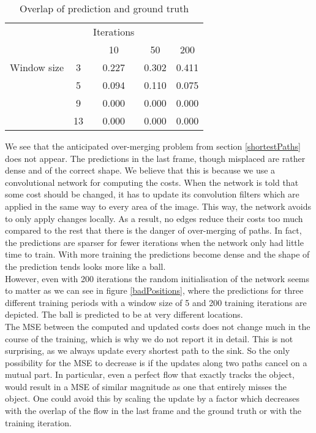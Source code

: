 \documentclass{article}
\begin{document}
{\begin{table}
  \caption{Overlap of prediction and ground truth}
  \label{overlap}
  \centering
  \begin{tabular}{lcccc}
    \hline
    \abovespace
			    & &Iterations &&\\
                &    & 10    & 50    & 200 \\
    \hline
    \abovespace
    Window size & 3  & 0.227 & 0.302 & 0.411 \\
                & 5  & 0.094 & 0.110 & 0.075 \\
                & 9  & 0.000 & 0.000 & 0.000 \\
                & 13 & 0.000 & 0.000 & 0.000 \\
    \hline
  \end{tabular}
\end{table}
We see that the anticipated over-merging problem from section \ref{shortestPaths} does not appear. The predictions in the last frame, though misplaced are rather dense and of the correct shape. We believe that this is because we use a convolutional network for computing the costs. When the network is told that some cost should be changed, it has to update its convolution filters which are applied in the same way to every area of the image. This way, the network avoids to only apply changes locally. As a result, no edges reduce their costs too much compared to the rest that there is the danger of over-merging of paths. In fact, the predictions are sparser for fewer iterations when the network only had little time to train. With more training the predictions become dense and the shape of the prediction tends looks more like a ball. \\
However, even with 200 iterations the random initialisation of the network seems to matter as we can see in figure \ref{badPositions}, where the predictions for three different training periods with a window size of 5 and 200 training iterations are depicted. The ball is predicted to be at very different locations.\\
The MSE between the computed and updated costs does not change much in the course of the training, which is why we do not report it in detail. This is not surprising, as we always update every shortest path to the sink. So the only possibility for the MSE to decrease is if the updates along two paths cancel on a mutual part. In particular, even a perfect flow that exactly tracks the object, would result in a MSE of similar magnitude as one that entirely misses the object. One could avoid this by scaling the update by a factor which decreases with the overlap of the flow in the last frame and the ground truth or with the training iteration.\\
}
\end{document}
